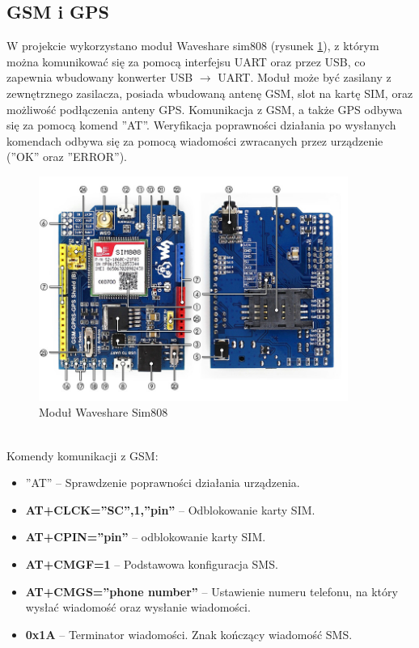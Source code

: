 \documentclass[10pt, a4paper]{article}
\begin{document}
\subsection{GSM i GPS}
W projekcie wykorzystano moduł Waveshare sim808 (rysunek \ref{fig:sim808}), z którym można komunikować się za pomocą interfejsu UART oraz przez USB, co zapewnia wbudowany konwerter USB $\rightarrow$ UART. Moduł może być zasilany z zewnętrznego zasilacza, posiada wbudowaną antenę GSM, slot na kartę SIM, oraz możliwość podłączenia anteny GPS. Komunikacja z GSM, a także GPS odbywa się za pomocą komend ''AT''. Weryfikacja poprawności działania po wysłanych komendach odbywa się za pomocą wiadomości zwracanych przez urządzenie (''OK'' oraz ''ERROR'').\\
\begin{figure}[!htb]
\centering
\includegraphics[width=0.9\textwidth]{./Sim808.PNG}
\caption{Moduł Waveshare Sim808\label{fig:sim808}}
\end{figure}\\
Komendy komunikacji z GSM:
\begin{itemize}
\item ''AT'' -- Sprawdzenie poprawności działania urządzenia.
\item \textbf{AT+CLCK=''SC'',1,''pin''} -- Odblokowanie karty SIM.
\item \textbf{AT+CPIN=''pin''} -- odblokowanie karty SIM.
\item \textbf{AT+CMGF=1} -- Podstawowa konfiguracja SMS.
\item \textbf{AT+CMGS=''phone number''} -- Ustawienie numeru telefonu, na który wysłać wiadomość oraz wysłanie wiadomości.
\item \textbf{0x1A} -- Terminator wiadomości. Znak kończący wiadomość SMS.
\end{itemize}
\end{document}
